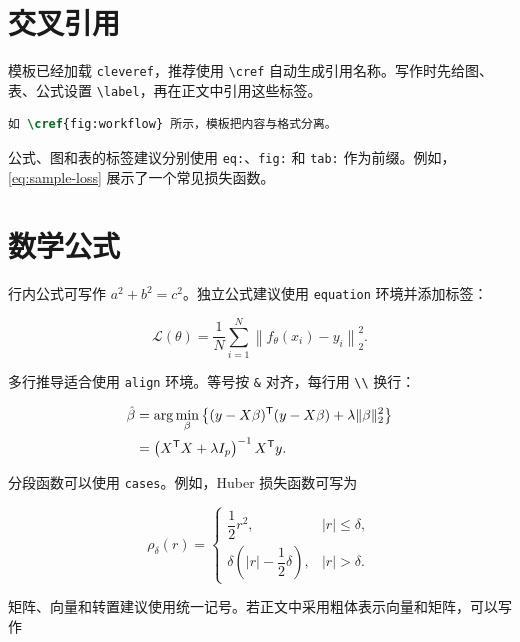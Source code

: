 \section{交叉引用}

模板已经加载 \texttt{cleveref}，推荐使用 \verb|\cref| 自动生成引用名称。写作时先给图、表、公式设置 \verb|\label|，再在正文中引用这些标签。

\begin{lstlisting}[language=TeX]
如 \cref{fig:workflow} 所示，模板把内容与格式分离。
\end{lstlisting}

公式、图和表的标签建议分别使用 \texttt{eq:}、\texttt{fig:} 和 \texttt{tab:} 作为前缀。例如，\cref{eq:sample-loss} 展示了一个常见损失函数。

\section{数学公式}

行内公式可写作 \(a^2+b^2=c^2\)。独立公式建议使用 \texttt{equation} 环境并添加标签：

\begin{equation}
  \mathcal{L}(\theta)=\frac{1}{N}\sum_{i=1}^{N}\left\lVert f_{\theta}(x_i)-y_i\right\rVert_2^2 .
  \label{eq:sample-loss}
\end{equation}

多行推导适合使用 \texttt{align} 环境。等号按 \verb|&| 对齐，每行用 \verb|\\| 换行：

\begin{align}
  \hat{\beta}
  &= \arg\min_{\beta}\left\{(y-X\beta)^{\mathsf T}(y-X\beta)+\lambda\lVert\beta\rVert_2^2\right\} \notag\\
  &= \left(X^{\mathsf T}X+\lambda I_p\right)^{-1}X^{\mathsf T}y .
  \label{eq:ridge}
\end{align}

分段函数可以使用 \texttt{cases}。例如，Huber 损失函数可写为

\begin{equation}
  \rho_{\delta}(r)=
  \begin{cases}
    \dfrac{1}{2}r^2, & |r|\le \delta,\\[0.4em]
    \delta\left(|r|-\dfrac{1}{2}\delta\right), & |r|>\delta .
  \end{cases}
  \label{eq:huber}
\end{equation}

矩阵、向量和转置建议使用统一记号。若正文中采用粗体表示向量和矩阵，可以写作

